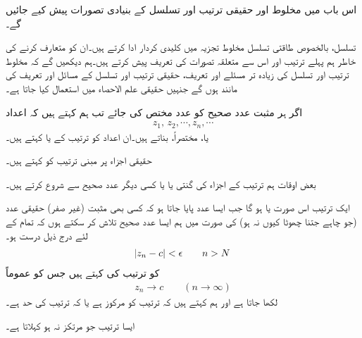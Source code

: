 اس باب میں مخلوط اور حقیقی ترتیب اور تسلسل کے بنیادی تصورات پیش کیے جائیں گے۔

تسلسل، بالخصوص طاقتی تسلسل مخلوط تجزیہ میں کلیدی کردار ادا کرتے ہیں۔ان کو متعارف کرنے کی خاطر ہم پہلے ترتیب اور اس سے متعلقہ تصورات کی تعریف پیش کرتے ہیں۔ہم دیکھیں گے کہ مخلوط  ترتیب اور تسلسل کی زیادہ تر مسئلے اور تعریف، حقیقی ترتیب اور تسلسل کے مسائل اور تعریف کی مانند ہوں گے جنہیں حقیقی علم الاحصاء میں استعمال کیا جاتا ہے۔

اگر ہر مثبت عدد صحیح  کو عدد  مختص کی جائے تب  ہم کہتے ہیں کہ اعداد
\begin{align*}
z_1,\,z_2,\cdots,z_n,\cdots
\end{align*} 
 یا،  مختصراً،  بناتے ہیں۔ان  اعداد  کو ترتیب کے  یا   کہتے ہیں۔

حقیقی اجزاء پر مبنی ترتیب کو  کہتے ہیں۔

بعض اوقات ہم ترتیب کے اجزاء کی گنتی  یا  یا کسی دیگر عدد صحیح سے شروع کرتے ہیں۔

ایک ترتیب  اس صورت   یا  ہو گا جب ایسا عدد  پایا جاتا ہو کہ کسی بھی مثبت  (غیر صفر) حقیقی عدد  (جو چاہے جتنا چھوٹا کیوں نہ ہو) کی صورت میں ہم ایسا عدد صحیح  تلاش کر سکتے ہوں کہ  تمام  کے لئے درج ذیل درست ہو۔
\begin{align}\label{مساوات_ترتیب_حد_الف}
\abs{z_n-c}<\epsilon \quad \quad  n>N
\end{align}
 کو ترتیب کی  کہتے ہیں جس کو عموماً
\begin{align*}
z_n\to c\quad\quad (n\to \infty)
\end{align*}
لکھا جاتا ہے اور ہم کہتے ہیں کہ ترتیب  کو مرکوز ہے یا کہ ترتیب کی حد  ہے۔

ایسا ترتیب جو مرتکز نہ ہو  کہلاتا ہے۔

